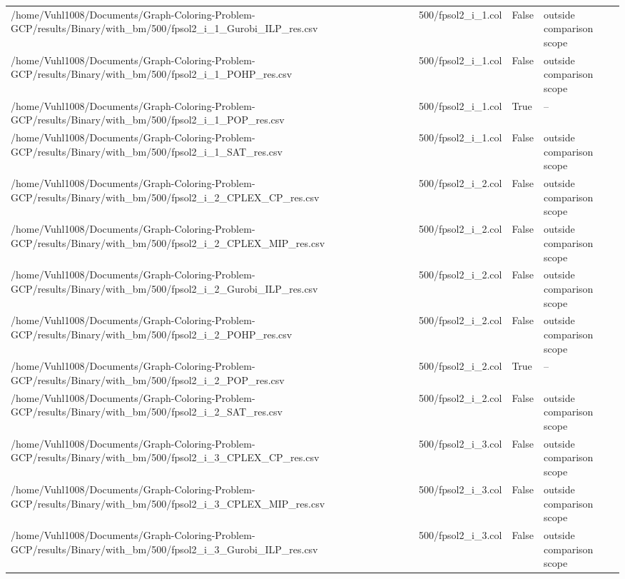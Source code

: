 \begin{table}[htbp]
\begin{tabular}{llll}
/home/Vuhl1008/Documents/Graph-Coloring-Problem-GCP/results/Binary/with\_bm/500/fpsol2\_i\_1\_Gurobi\_ILP\_res.csv & 500/fpsol2\_i\_1.col & False & outside comparison scope \\
/home/Vuhl1008/Documents/Graph-Coloring-Problem-GCP/results/Binary/with\_bm/500/fpsol2\_i\_1\_POHP\_res.csv & 500/fpsol2\_i\_1.col & False & outside comparison scope \\
/home/Vuhl1008/Documents/Graph-Coloring-Problem-GCP/results/Binary/with\_bm/500/fpsol2\_i\_1\_POP\_res.csv & 500/fpsol2\_i\_1.col & True & -- \\
/home/Vuhl1008/Documents/Graph-Coloring-Problem-GCP/results/Binary/with\_bm/500/fpsol2\_i\_1\_SAT\_res.csv & 500/fpsol2\_i\_1.col & False & outside comparison scope \\
/home/Vuhl1008/Documents/Graph-Coloring-Problem-GCP/results/Binary/with\_bm/500/fpsol2\_i\_2\_CPLEX\_CP\_res.csv & 500/fpsol2\_i\_2.col & False & outside comparison scope \\
/home/Vuhl1008/Documents/Graph-Coloring-Problem-GCP/results/Binary/with\_bm/500/fpsol2\_i\_2\_CPLEX\_MIP\_res.csv & 500/fpsol2\_i\_2.col & False & outside comparison scope \\
/home/Vuhl1008/Documents/Graph-Coloring-Problem-GCP/results/Binary/with\_bm/500/fpsol2\_i\_2\_Gurobi\_ILP\_res.csv & 500/fpsol2\_i\_2.col & False & outside comparison scope \\
/home/Vuhl1008/Documents/Graph-Coloring-Problem-GCP/results/Binary/with\_bm/500/fpsol2\_i\_2\_POHP\_res.csv & 500/fpsol2\_i\_2.col & False & outside comparison scope \\
/home/Vuhl1008/Documents/Graph-Coloring-Problem-GCP/results/Binary/with\_bm/500/fpsol2\_i\_2\_POP\_res.csv & 500/fpsol2\_i\_2.col & True & -- \\
/home/Vuhl1008/Documents/Graph-Coloring-Problem-GCP/results/Binary/with\_bm/500/fpsol2\_i\_2\_SAT\_res.csv & 500/fpsol2\_i\_2.col & False & outside comparison scope \\
/home/Vuhl1008/Documents/Graph-Coloring-Problem-GCP/results/Binary/with\_bm/500/fpsol2\_i\_3\_CPLEX\_CP\_res.csv & 500/fpsol2\_i\_3.col & False & outside comparison scope \\
/home/Vuhl1008/Documents/Graph-Coloring-Problem-GCP/results/Binary/with\_bm/500/fpsol2\_i\_3\_CPLEX\_MIP\_res.csv & 500/fpsol2\_i\_3.col & False & outside comparison scope \\
/home/Vuhl1008/Documents/Graph-Coloring-Problem-GCP/results/Binary/with\_bm/500/fpsol2\_i\_3\_Gurobi\_ILP\_res.csv & 500/fpsol2\_i\_3.col & False & outside comparison scope \\

\end{tabular}
\end{table}
